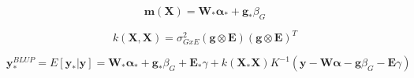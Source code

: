 \begin{equation}
    \mathbf{m}(\mathbf{X}) = \mathbf{W}_*\boldsymbol{\alpha}_{*}+\mathbf{g}_*\beta_G
\end{equation}

\begin{equation}
    k(\mathbf{X},\mathbf{X}) = \sigma_{GxE}^2(\mathbf{g}\otimes\mathbf{E})(\mathbf{g}\otimes\mathbf{E})^T
\end{equation}

\begin{equation}
\mathbf{y}_{*}^{BLUP} = E[\mathbf{y}_*|\mathbf{y}] = 
\mathbf{W}_*\boldsymbol{\alpha}_{*}+\mathbf{g}_*\beta_G+\mathbf{E}_*\gamma + 
k(\mathbf{X}_*\mathbf{X})K^{-1}(\mathbf{y}-\mathbf{W}\boldsymbol{\alpha}-\mathbf{g}\beta_G-\mathbf{E}\gamma)
\end{equation}